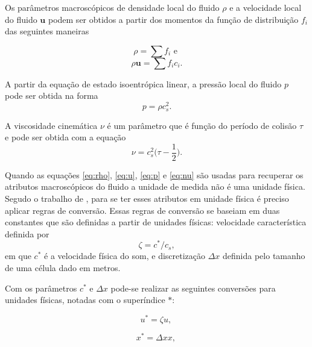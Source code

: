 Os parâmetros macroscópicos de densidade local do fluido $\rho$ e a velocidade local do fluido $\textbf{u}$ podem ser obtidos a partir dos momentos da função de distribuição $f_{i}$ das seguintes maneiras

\begin{equation}
  \rho = \sum{f_{i}} \text{   e }
    \label{eq:rho}
\end{equation}
\begin{equation}
  \rho \textbf{u} = \sum{f_{i} c_{i}}.
    \label{eq:u}
\end{equation}

A partir da equação de estado isoentrópica linear, a pressão local do fluido $p$ pode ser obtida na forma
\begin{equation}
  p = \rho c^{2}_{s}.
    \label{eq:p}
\end{equation}

A viscosidade cinemática $\nu$ é um parâmetro que é função do período de colisão $\tau$ e pode ser obtida com a equação
\begin{equation}
	\nu = c^{2}_{s} \bigg(\tau - \frac{1}{2}\bigg).
    \label{eq:nu}
\end{equation}

Quando as equações \ref{eq:rho}, \ref{eq:u}, \ref{eq:p} e \ref{eq:nu} são usadas para recuperar os atributos macroscópicos do fluido a unidade de medida não é uma unidade física. Segudo o trabalho de , para se ter esses atributos em unidade física é preciso aplicar regras de conversão. Essas regras de conversão se baseiam em duas constantes que são definidas a partir de unidades físicas: velocidade característica definida por   
\begin{equation}
  \zeta = c^{*}/c_{s},
    \label{eq:conversao_1}
\end{equation}
em que $c^{*}$ é a velocidade física do som, e discretização $\Delta x$ definida pelo tamanho de uma célula dado em metros.

Com os parâmetros $c^{*}$ e $\Delta x$ pode-se realizar as seguintes conversões para unidades físicas, notadas com o superíndice $*$:

\begin{equation}
  \textbf{$u^{*}$} = \zeta \textbf{$u$}\text{, }
  \label{eq:conversao_2}
\end{equation}

\begin{equation}
  \textbf{$x^{*}$} = \Delta x\textbf{$x$}\text{, }
  \label{eq:conversao_3}
\end{equation}
  
